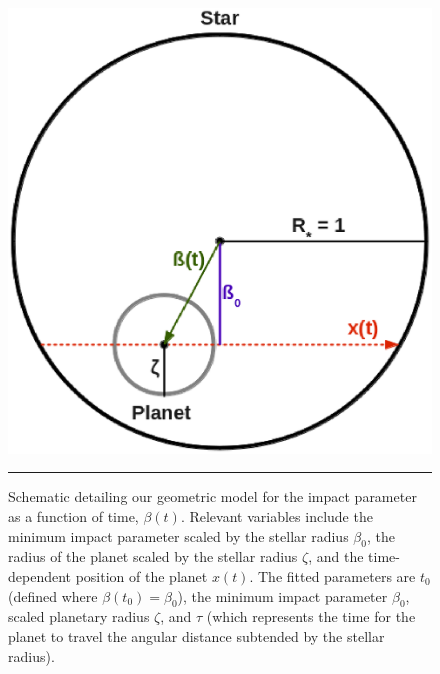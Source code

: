 \begin{figure}[t] 
  \begin{minipage}[c]{0.37\textwidth}
    \includegraphics[width=\textwidth]{figures/schem.eps}
  \end{minipage}\hfill
  \begin{minipage}[c]{0.6\textwidth}
    \caption{Schematic detailing our geometric model for the impact
      parameter as a function of time, $\beta(t)$.  Relevant variables
      include the minimum impact parameter scaled by the stellar radius
      $\beta_0$, the radius of the planet scaled by the stellar radius
      $\zeta$, and the time-dependent position of the planet $x(t)$.  The
      fitted parameters are $t_0$ (defined where $\beta(t_0) = \beta_0$),
      the minimum impact parameter $\beta_0$, scaled planetary radius
      $\zeta$, and $\tau$ (which represents the time for the planet to
      travel the angular distance subtended by the stellar radius). }
    \label{fig-schem}
    \hspace*{\fill}  
    \hrule
  \end{minipage}
\end{figure}

